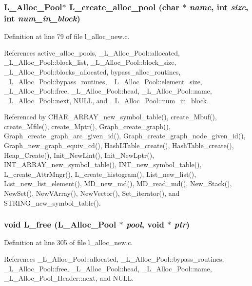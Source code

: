 \subsubsection{\setlength{\rightskip}{0pt plus 5cm}\bf{L\_\-Alloc\_\-Pool}$\ast$ L\_\-create\_\-alloc\_\-pool (char $\ast$ {\em name}, int {\em size}, int {\em num\_\-in\_\-block})}\label{l__alloc__new_8c_30a4dca94185560df25948489dee2d93}




Definition at line 79 of file l\_\-alloc\_\-new.c.

References active\_\-alloc\_\-pools, \_\-L\_\-Alloc\_\-Pool::allocated, \_\-L\_\-Alloc\_\-Pool::block\_\-list, \_\-L\_\-Alloc\_\-Pool::block\_\-size, \_\-L\_\-Alloc\_\-Pool::blocks\_\-allocated, bypass\_\-alloc\_\-routines, \_\-L\_\-Alloc\_\-Pool::bypass\_\-routines, \_\-L\_\-Alloc\_\-Pool::element\_\-size, \_\-L\_\-Alloc\_\-Pool::free, \_\-L\_\-Alloc\_\-Pool::head, \_\-L\_\-Alloc\_\-Pool::name, \_\-L\_\-Alloc\_\-Pool::next, NULL, and \_\-L\_\-Alloc\_\-Pool::num\_\-in\_\-block.

Referenced by CHAR\_\-ARRAY\_\-new\_\-symbol\_\-table(), create\_\-Mbuf(), create\_\-Mfile(), create\_\-Mptr(), Graph\_\-create\_\-graph(), Graph\_\-create\_\-graph\_\-arc\_\-given\_\-id(), Graph\_\-create\_\-graph\_\-node\_\-given\_\-id(), Graph\_\-new\_\-graph\_\-equiv\_\-cd(), Hash\-LTable\_\-create(), Hash\-Table\_\-create(), Heap\_\-Create(), Init\_\-New\-Lint(), Init\_\-New\-Lptr(), INT\_\-ARRAY\_\-new\_\-symbol\_\-table(), INT\_\-new\_\-symbol\_\-table(), L\_\-create\_\-Attr\-Mngr(), L\_\-create\_\-histogram(), List\_\-new\_\-list(), List\_\-new\_\-list\_\-element(), MD\_\-new\_\-md(), MD\_\-read\_\-md(), New\_\-Stack(), New\-Set(), New\-VArray(), New\-Vector(), Set\_\-iterator(), and STRING\_\-new\_\-symbol\_\-table().
\subsubsection{\setlength{\rightskip}{0pt plus 5cm}void L\_\-free (\bf{L\_\-Alloc\_\-Pool} $\ast$ {\em pool}, void $\ast$ {\em ptr})}\label{l__alloc__new_8c_de8b565e7dd21f448acc6fd31bea94ac}




Definition at line 305 of file l\_\-alloc\_\-new.c.

References \_\-L\_\-Alloc\_\-Pool::allocated, \_\-L\_\-Alloc\_\-Pool::bypass\_\-routines, \_\-L\_\-Alloc\_\-Pool::free, \_\-L\_\-Alloc\_\-Pool::head, \_\-L\_\-Alloc\_\-Pool::name, \_\-L\_\-Alloc\_\-Pool\_\-Header::next, and NULL.

